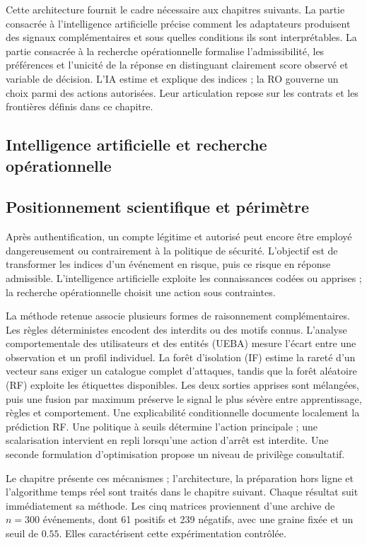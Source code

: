 \documentclass[11pt,a4paper,oneside]{report}
\theoremstyle{definition}
\theoremstyle{plain}
\begin{document}
Cette architecture fournit le cadre nécessaire aux chapitres suivants. La
partie consacrée à l'intelligence artificielle précise comment les adaptateurs
produisent des signaux complémentaires et sous quelles conditions ils sont
interprétables. La partie consacrée à la recherche opérationnelle formalise
l'admissibilité, les préférences et l'unicité de la réponse en distinguant
clairement score observé et variable de décision. L'IA estime et explique des
indices ; la RO gouverne un choix parmi des actions autorisées. Leur articulation
repose sur les contrats et les frontières définis dans ce chapitre.

\subsection{Intelligence artificielle et recherche opérationnelle}
\label{sec:method-ai-ro}

\subsection{Positionnement scientifique et périmètre}

Après authentification, un compte légitime et autorisé peut encore être employé
dangereusement ou contrairement à la politique de sécurité. L'objectif est de
transformer les indices d'un événement en risque, puis ce risque en réponse admissible.
L'intelligence artificielle exploite les connaissances codées ou apprises ; la
recherche opérationnelle choisit une action sous contraintes.

La méthode retenue associe plusieurs formes de raisonnement complémentaires. Les
règles déterministes encodent des interdits ou des motifs connus. L'analyse
comportementale des utilisateurs et des entités (UEBA) mesure l'écart entre une
observation et un profil individuel. La forêt d'isolation (IF) estime la rareté
d'un vecteur sans exiger un catalogue complet d'attaques, tandis que la forêt
aléatoire (RF) exploite les étiquettes disponibles. Les deux sorties apprises sont
mélangées, puis une fusion par maximum préserve le signal le plus sévère entre
apprentissage, règles et comportement. Une explicabilité conditionnelle documente
localement la prédiction RF. Une politique à seuils détermine l'action principale ;
une scalarisation intervient en repli lorsqu'une action d'arrêt est interdite.
Une seconde formulation d'optimisation propose un niveau de privilège consultatif.

Le chapitre présente ces mécanismes ; l'architecture, la préparation hors ligne
et l'algorithme temps réel sont traités dans le chapitre suivant. Chaque résultat
suit immédiatement sa méthode. Les cinq matrices proviennent d'une archive de
$n=300$ événements, dont 61 positifs et 239 négatifs, avec une graine fixée et
un seuil de $0.55$. Elles caractérisent cette expérimentation contrôlée.
\end{document}
